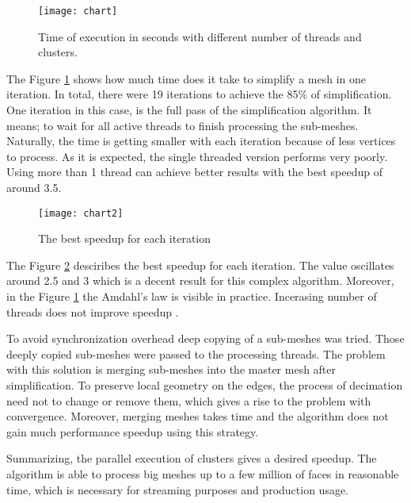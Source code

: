 \begin{figure}[h!]
  \begin{center}
    \texttt{[image: chart]}
    \caption{Time of execution in seconds with different number of threads and clusters.}
    \label{fig:execution_time}
  \end{center}
\end{figure}

The Figure \ref{fig:execution_time} shows how much time does it take to simplify a mesh in one iteration. In total, there were 19 iterations to achieve the 85\% of simplification. One iteration in this case, is the full pass of the simplification algorithm. It means; to wait for all active threads to finish processing the sub-meshes. Naturally, the time is getting smaller with each iteration because of less vertices to process. As it is expected, the single threaded version performs very poorly. Using more than 1 thread can achieve better results with the best speedup of around 3.5.

\begin{figure}[H]
  \begin{center}
    \texttt{[image: chart2]}
    \caption{The best speedup for each iteration}
    \label{fig:speedup}
  \end{center}
\end{figure}

The Figure \ref{fig:speedup} desciribes the best speedup for each iteration. The value oscillates around 2.5 and 3 which is a decent result for this complex algorithm. Moreover, in the Figure \ref{fig:execution_time} the Amdahl's law is visible in practice. Incerasing number of threads does not improve speedup \cite{amdahl67}.

To avoid synchronization overhead deep copying of a sub-meshes was tried. Those deeply copied sub-meshes were passed to the processing threads. The problem with this solution is merging sub-meshes into the master mesh after simplification. To preserve local geometry on the edges, the process of decimation need not to change or remove them, which gives a rise to the problem with convergence. Moreover, merging meshes takes time and the algorithm does not gain much performance speedup using this strategy.

Summarizing, the parallel execution of clusters gives a desired speedup. The algorithm is able to process big meshes up to a few million of faces in reasonable time, which is necessary for streaming purposes and production usage.

